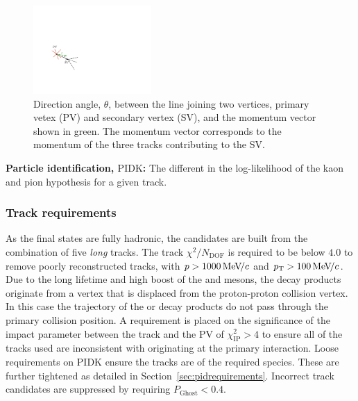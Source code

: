 \begin{description}
\begin{figure}[!h]
    \centering
    \includegraphics[width=0.4\textwidth]{figs/Selection/DIRA.pdf}
    \caption{Direction angle, $\theta$, between the line joining two vertices, primary vetex (PV) and secondary vertex (SV), and the momentum vector shown in green. The momentum vector corresponds to the momentum of the three tracks contributing to the SV. }
    \label{fig:dira}   
\end{figure}


\item \textbf{Particle identification, $\text{PIDK}$:} The different in the log-likelihood of the kaon and pion hypothesis for a given track.  
\end{description}


\subsubsection{Track requirements}
As the final states are fully hadronic, the candidates are built from the combination of five \emph{long} tracks.  
The track $\chi^{2}/N_{\text{DOF}}$ is required to be below $4.0$ to remove poorly reconstructed tracks, with $\mbox{$p$} > 1000 {\mathrm{\,Me\kern -0.1em V\!/}c}$ and $\mbox{$p_{\mathrm{ T}}$} > 100 {\mathrm{\,Me\kern -0.1em V\!/}c}$.
Due to the long lifetime and high boost of the \Bp and \D mesons, the decay products originate from a vertex that is displaced from the proton-proton collision vertex. In this case the trajectory of the \Bp or \D decay products do not pass through the primary collision position. A requirement is placed on the significance of the impact parameter between the track and the PV of $\chi^{2}_{\text{IP}} > 4$ to ensure all of the tracks used are inconsistent with originating at the primary interaction.  
Loose requirements on PIDK ensure the tracks are of the required species. These are further tightened as detailed in Section~\ref{sec:pidrequirements}. Incorrect track candidates are suppressed by requiring $P_{\text{Ghost}}<0.4$. 

